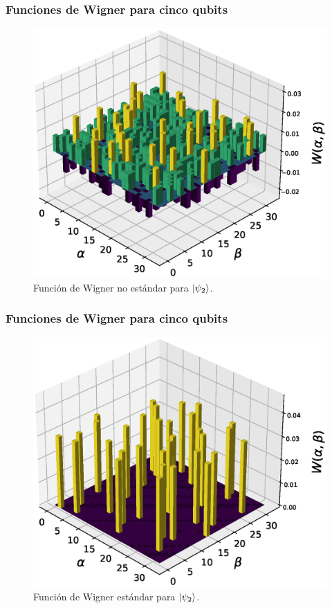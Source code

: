 \documentclass[10pt,spanish]{beamer}
\begin{document}
  \begin{frame}
    \frametitle{Funciones de Wigner para cinco qubits}

    \begin{figure}[h]
      \centering
      \includegraphics[scale=0.35]{
        paper/pres_graphs/32_woo_2.eps
      }
      \caption{
        Función de Wigner no estándar para $\ket{\psi_2}$.
      }
      \label{fig:wigner-kantor-2-5-s2}
    \end{figure}
  \end{frame}

  \begin{frame}
    \frametitle{Funciones de Wigner para cinco qubits}

    \begin{figure}[h]
      \centering
      \includegraphics[scale=0.35]{
        paper/pres_graphs/32_kan_2.eps
      }
      \caption{
        Función de Wigner estándar para $\ket{\psi_2}$.
      }
      \label{fig:wigner-standard-2-5-s2}
    \end{figure}
  \end{frame}
\end{document}
